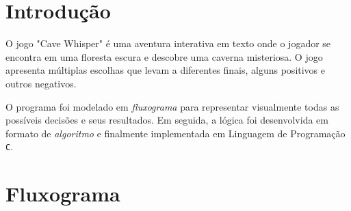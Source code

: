 \documentclass[a4paper,12pt]{article} %
\begin{document}
\section{Introdução}

O jogo "Cave Whisper" é uma aventura interativa em texto onde o jogador se encontra em uma floresta escura e descobre uma caverna misteriosa. O jogo apresenta múltiplas escolhas que levam a diferentes finais, alguns positivos e outros negativos.

O programa foi modelado em \textit{fluxograma} para representar visualmente todas as possíveis decisões e seus resultados. Em seguida, a lógica foi desenvolvida em formato de \textit{algoritmo} e finalmente implementada em Linguagem de Programação \texttt{C}.

\section{Fluxograma}
\end{document}
